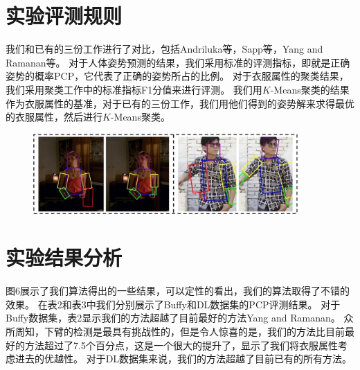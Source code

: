 \section{实验评测规则}
我们和已有的三份工作进行了对比，包括Andriluka等\cite{cvpr09}，Sapp等\cite{eccv10}，Yang and Ramanan等\cite{deva11}。
对于人体姿势预测的结果，我们采用标准的评测指标，即就是正确姿势的概率PCP\cite{fer09}，它代表了正确的姿势所占的比例。
对于衣服属性的聚类结果，我们采用聚类工作中的标准指标F1分值来进行评测。
我们用$K$-Means聚类的结果作为衣服属性的基准，对于已有的三份工作，我们用他们得到的姿势解来求得最优的衣服属性，然后进行$K$-Means聚类。


\begin{figure}[tbp]
\centering
\includegraphics[width=0.9\textwidth]{img/compare.jpg}
\label{fig:compare}
\end{figure}

\section{实验结果分析}
图6展示了我们算法得出的一些结果，可以定性的看出，我们的算法取得了不错的效果。
在表2和表3中我们分别展示了Buffy和DL数据集的PCP评测结果。
对于Buffy数据集，表2显示我们的方法超越了目前最好的方法Yang and Ramanan\cite{deva11}。
众所周知，下臂的检测是最具有挑战性的，但是令人惊喜的是，我们的方法比目前最好的方法超过了7.5个百分点，这是一个很大的提升了，显示了我们将衣服属性考虑进去的优越性。
对于DL数据集来说，我们的方法超越了目前已有的所有方法。

